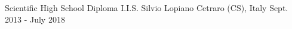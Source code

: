 \begin{cventries}
\cventry
    {Scientific High School Diploma} %
    {I.I.S. Silvio Lopiano} %
    {Cetraro (CS), Italy} %
    {Sept. 2013 - July 2018} %
    {
      \begin{cvitems} %
      \end{cvitems}
    }


\end{cventries}

